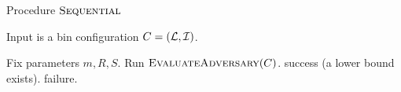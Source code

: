 \begin{algorithm}
\caption{Procedure $\textsc{Sequential}$}
\noindent Input is a bin configuration $C = ({\mathcal L},{\mathcal I})$. 
\begin{algorithmic}[1]
\State Fix parameters $m,R,S$.
\State Run $\textsc{EvaluateAdversary}(C)$.
\State \Return success (a lower bound exists).
\Else
\State \Return failure.
\EndIf
\end{algorithmic}
\end{algorithm}
